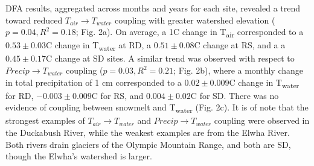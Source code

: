 \documentclass{article}
\begin{document}
DFA results, aggregated across months and years for each site, revealed a trend toward reduced $T_{air}\rightarrow T_{water}$ coupling with greater watershed elevation ($p=0.04, R^2=0.18$; Fig. 2a). On average, a 1\degree C change in T\textsubscript{air} corresponded to a $0.53\pm 0.03$\degree C change in T\textsubscript{water} at RD, a $0.51\pm 0.08$\degree C change at RS, and a a $0.45\pm 0.17$\degree C change at SD sites. A similar trend was observed with respect to $Precip\rightarrow T_{water}$ coupling ($p=0.03, R^2=0.21$; Fig. 2b), where a monthly change in total precipitation of 1 cm corresponded to a $0.02\pm 0.009$\degree C change in T\textsubscript{water} for RD, $-0.003\pm 0.009$\degree C for RS, and $0.004\pm 0.02$\degree C for SD. There was no evidence of coupling between snowmelt and T\textsubscript{water} (Fig. 2c). It is of note that the strongest examples of $T_{air}\rightarrow T_{water}$ and $Precip\rightarrow T_{water}$ coupling were observed in the Duckabush River, while the weakest examples are from the Elwha River. Both rivers drain glaciers of the Olympic Mountain Range, and both are SD, though the Elwha's watershed is larger.

\end{document}

